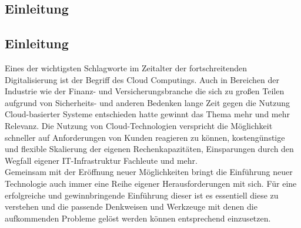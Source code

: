 \begin{spacing}{1.2}

\chapter{Einleitung}
\label{sec:einl}

\section{Einleitung}
Eines der wichtigsten Schlagworte im Zeitalter der fortschreitenden
Digitalisierung ist der Begriff des Cloud Computings. Auch in Bereichen
der Industrie wie der Finanz-
und Versicherungsbranche die sich zu großen Teilen aufgrund von
Sicherheits- und anderen Bedenken lange Zeit gegen die Nutzung
Cloud-basierter Systeme entschieden hatte gewinnt das Thema mehr und mehr
Relevanz. Die Nutzung von Cloud-Technologien verspricht die Möglichkeit
schneller auf Anforderungen von Kunden reagieren zu können,
kostengünstige und flexible Skalierung der eigenen Rechenkapazitäten,
Einsparungen durch den Wegfall eigener IT-Infrastruktur Fachleute und mehr.\\
Gemeinsam mit der Eröffnung neuer Möglichkeiten bringt die Einführung neuer
Technologie auch immer eine Reihe eigener Herausforderungen
mit sich. Für eine erfolgreiche und gewinnbringende Einführung dieser ist
es essentiell diese zu verstehen und die passende Denkweisen und Werkzeuge
mit denen die aufkommenden Probleme gelöst werden können entsprechend
einzusetzen.


\end{spacing}
